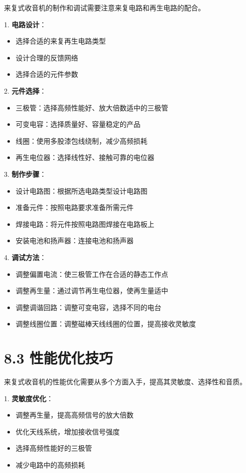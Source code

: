 \documentclass[12pt,UTF8]{ctexbook}
\begin{document}
来复式收音机的制作和调试需要注意来复电路和再生电路的配合。

1. \textbf{电路设计}：
   \begin{itemize}[leftmargin=3.5em]
   \item 选择合适的来复再生电路类型
   \item 设计合理的反馈网络
   \item 选择合适的元件参数
   \end{itemize}

2. \textbf{元件选择}：
   \begin{itemize}[leftmargin=3.5em]
   \item 三极管：选择高频性能好、放大倍数适中的三极管
   \item 可变电容：选择质量好、容量稳定的产品
   \item 线圈：使用多股漆包线绕制，减少高频损耗
   \item 再生电位器：选择线性好、接触可靠的电位器
   \end{itemize}

3. \textbf{制作步骤}：
   \begin{itemize}[leftmargin=3.5em]
   \item 设计电路图：根据所选电路类型设计电路图
   \item 准备元件：按照电路要求准备所需元件
   \item 焊接电路：将元件按照电路图焊接在电路板上
   \item 安装电池和扬声器：连接电池和扬声器
   \end{itemize}

4. \textbf{调试方法}：
   \begin{itemize}[leftmargin=3.5em]
   \item 调整偏置电流：使三极管工作在合适的静态工作点
   \item 调整再生量：通过调节再生电位器，使再生量适中
   \item 调整调谐回路：调整可变电容，选择不同的电台
   \item 调整线圈位置：调整磁棒天线线圈的位置，提高接收灵敏度
   \end{itemize}

\section*{8.3 性能优化技巧}

来复式收音机的性能优化需要从多个方面入手，提高其灵敏度、选择性和音质。

1. \textbf{灵敏度优化}：
   \begin{itemize}[leftmargin=3.5em]
   \item 调整再生量，提高高频信号的放大倍数
   \item 优化天线系统，增加接收信号强度
   \item 选择高频性能好的三极管
   \item 减少电路中的高频损耗
   \end{itemize}
\end{document}
